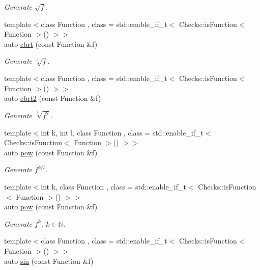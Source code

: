 \begin{DoxyCompactItemize}
\begin{DoxyCompactList}\small\item\em Generate $ \sqrt{f} $. \end{DoxyCompactList}\item 
{\footnotesize template$<$class Function , class  = std\+::enable\+\_\+if\+\_\+t$<$ Checks\+::is\+Function$<$ Function $>$() $>$$>$ }\\auto \hyperlink{group__CMathGroup_gaa7f2552adfb8ec41aeb685adddd8bf98}{cbrt} (const Function \&f)
\begin{DoxyCompactList}\small\item\em Generate $ \sqrt[3]{f} $. \end{DoxyCompactList}\item 
{\footnotesize template$<$class Function , class  = std\+::enable\+\_\+if\+\_\+t$<$ Checks\+::is\+Function$<$ Function $>$() $>$$>$ }\\auto \hyperlink{group__CMathGroup_gafd27322fb64c6df3366f384c93819a06}{cbrt2} (const Function \&f)
\begin{DoxyCompactList}\small\item\em Generate $ \sqrt[3]{f^2}$. \end{DoxyCompactList}\item 
{\footnotesize template$<$int k, int l, class Function , class  = std\+::enable\+\_\+if\+\_\+t$<$ Checks\+::is\+Function$<$ Function $>$() $>$$>$ }\\auto \hyperlink{group__CMathGroup_gaecae6fa60bbfc0eb1867581ee4577d4e}{pow} (const Function \&f)
\begin{DoxyCompactList}\small\item\em Generate $ f^{k/l} $. \end{DoxyCompactList}\item 
{\footnotesize template$<$int k, class Function , class  = std\+::enable\+\_\+if\+\_\+t$<$ Checks\+::is\+Function$<$ Function $>$() $>$$>$ }\\auto \hyperlink{group__CMathGroup_gab52ffe2efd379aad7ea322de46103465}{pow} (const Function \&f)
\begin{DoxyCompactList}\small\item\em Generate $ f^k,\ k\in\mathbb{N}$. \end{DoxyCompactList}\item 
{\footnotesize template$<$class Function , class  = std\+::enable\+\_\+if\+\_\+t$<$ Checks\+::is\+Function$<$ Function $>$() $>$$>$ }\\auto \hyperlink{group__CMathGroup_ga663fdbe7a8977cba529c7c33981b7738}{sin} (const Function \&f)

\end{DoxyCompactItemize}
